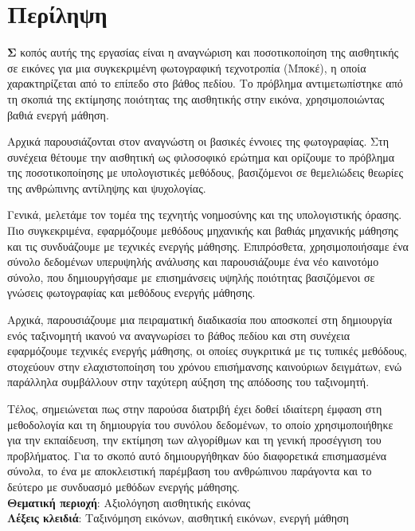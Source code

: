 \chapter*{Περίληψη}
\lettrine[lines=2]{\textbf{Σ}}{} κοπός αυτής της εργασίας είναι η αναγνώριση και ποσοτικοποίηση της αισθητικής σε εικόνες για μια συγκεκριμένη φωτογραφική τεχνοτροπία (Μποκέ), η οποία χαρακτηρίζεται από το επίπεδο στο βάθος πεδίου. Το πρόβλημα αντιμετωπίστηκε από τη σκοπιά της εκτίμησης ποιότητας της αισθητικής στην εικόνα, χρησιμοποιώντας βαθιά ενεργή μάθηση.

Αρχικά παρουσιάζονται στον αναγνώστη οι βασικές έννοιες της φωτογραφίας. Στη συνέχεια θέτουμε την αισθητική ως φιλοσοφικό ερώτημα και ορίζουμε το πρόβλημα της ποσοτικοποίησης με υπολογιστικές μεθόδους, βασιζόμενοι σε θεμελιώδεις θεωρίες της ανθρώπινης αντίληψης και ψυχολογίας.

Γενικά, μελετάμε τον τομέα της τεχνητής νοημοσύνης και της υπολογιστικής όρασης. Πιο συγκεκριμένα, εφαρμόζουμε μεθόδους μηχανικής και βαθιάς μηχανικής μάθησης και τις συνδυάζουμε με τεχνικές ενεργής μάθησης. 
Επιπρόσθετα, χρησιμοποιήσαμε ένα σύνολο δεδομένων υπερυψηλής ανάλυσης και παρουσιάζουμε ένα νέο καινοτόμο σύνολο, που δημιουργήσαμε με επισημάνσεις υψηλής ποιότητας βασιζόμενοι σε γνώσεις φωτογραφίας και μεθόδους ενεργής μάθησης.

Αρχικά, παρουσιάζουμε μια πειραματική διαδικασία που αποσκοπεί στη δημιουργία ενός ταξινομητή ικανού να αναγνωρίσει το βάθος πεδίου και στη συνέχεια εφαρμόζουμε τεχνικές ενεργής μάθησης, οι οποίες συγκριτικά με τις τυπικές μεθόδους, στοχεύουν στην ελαχιστοποίηση του χρόνου επισήμανσης καινούριων δειγμάτων, ενώ παράλληλα συμβάλλουν στην ταχύτερη αύξηση της απόδοσης του ταξινομητή.

Τέλος, σημειώνεται πως στην παρούσα διατριβή έχει δοθεί ιδιαίτερη έμφαση στη μεθοδολογία και τη δημιουργία του συνόλου δεδομένων, το οποίο χρησιμοποιήθηκε για την εκπαίδευση, την εκτίμηση των αλγορίθμων και τη γενική προσέγγιση του προβλήματος. 
Για το σκοπό αυτό δημιουργήθηκαν δύο διαφορετικά επισημασμένα σύνολα, το ένα με αποκλειστική παρέμβαση του ανθρώπινου παράγοντα και το δεύτερο με συνδυασμό μεθόδων ενεργής μάθησης.\\
\textbf{Θεματική περιοχή}: Αξιολόγηση αισθητικής εικόνας\\
\textbf{Λέξεις κλειδιά}: Ταξινόμηση εικόνων, αισθητική εικόνων, ενεργή μάθηση
